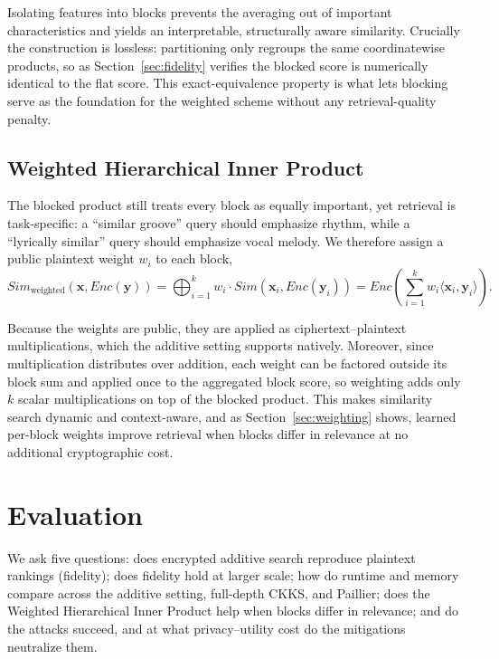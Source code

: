 \documentclass[sigconf,nonacm]{acmart}
\begin{document}
Isolating features into blocks prevents the averaging out of important characteristics and yields an interpretable, structurally aware similarity. Crucially the construction is lossless: partitioning only regroups the same coordinatewise products, so as Section~\ref{sec:fidelity} verifies the blocked score is numerically identical to the flat score. This exact-equivalence property is what lets blocking serve as the foundation for the weighted scheme without any retrieval-quality penalty.

\subsection{Weighted Hierarchical Inner Product}
\label{subsec:whip}
The blocked product still treats every block as equally important, yet retrieval is task-specific: a ``similar groove'' query should emphasize rhythm, while a ``lyrically similar'' query should emphasize vocal melody. We therefore assign a public plaintext weight $w_i$ to each block,
\begin{equation}
Sim_{\text{weighted}}(\mathbf{x},Enc(\mathbf{y}))=\bigoplus_{i=1}^{k} w_i\cdot Sim(\mathbf{x}_i,Enc(\mathbf{y}_i))=Enc\!\left(\sum_{i=1}^{k} w_i\langle\mathbf{x}_i,\mathbf{y}_i\rangle\right).
\label{eq:whip}
\end{equation}

Because the weights are public, they are applied as ciphertext--plaintext multiplications, which the additive setting supports natively. Moreover, since multiplication distributes over addition, each weight can be factored outside its block sum and applied once to the aggregated block score, so weighting adds only $k$ scalar multiplications on top of the blocked product. This makes similarity search dynamic and context-aware, and as Section~\ref{sec:weighting} shows, learned per-block weights improve retrieval when blocks differ in relevance at no additional cryptographic cost.

\section{Evaluation}
\label{sec:eval}
We ask five questions: does encrypted additive search reproduce plaintext rankings (fidelity); does fidelity hold at larger scale; how do runtime and memory compare across the additive setting, full-depth CKKS, and Paillier; does the Weighted Hierarchical Inner Product help when blocks differ in relevance; and do the attacks succeed, and at what privacy--utility cost do the mitigations neutralize them.
\end{document}
